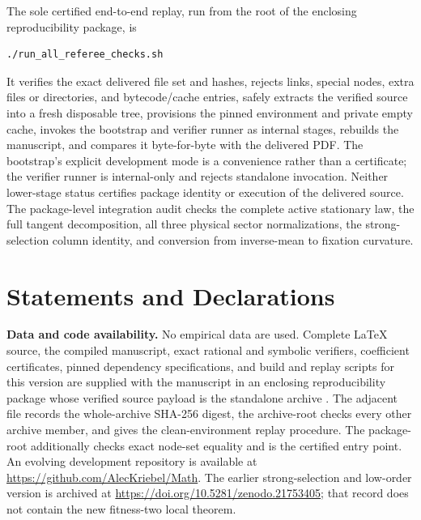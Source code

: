 The sole certified end-to-end replay, run from the root of the enclosing
reproducibility package, is
\begin{verbatim}
./run_all_referee_checks.sh
\end{verbatim}
It verifies the exact delivered file set and hashes, rejects links, special
nodes, extra files or directories, and bytecode/cache entries, safely extracts
the verified source into a fresh disposable tree, provisions the pinned
environment and private empty cache, invokes the bootstrap and verifier runner
as internal stages, rebuilds the manuscript, and compares it byte-for-byte
with the delivered PDF.  The bootstrap's explicit development mode is a
convenience rather than a certificate; the verifier runner is internal-only
and rejects standalone invocation.  Neither lower-stage status certifies
package identity or execution of the delivered source.  The package-level
integration audit checks the complete active stationary law, the full tangent
decomposition, all three physical sector normalizations, the strong-selection
column identity, and conversion from inverse-mean to fixation curvature.

\section*{Statements and Declarations}

\noindent\textbf{Data and code availability.}
No empirical data are used.  Complete LaTeX source, the compiled manuscript,
exact rational and symbolic verifiers, coefficient certificates, pinned
dependency specifications, and build and replay scripts for this version are
supplied with the manuscript in an enclosing reproducibility package whose
verified source payload is the standalone archive
.  The
adjacent file
records the whole-archive SHA-256 digest, the archive-root
 checks every other archive member, and
 gives the clean-environment replay
procedure.  The package-root  additionally
checks exact node-set equality and is the certified entry point.  An evolving
development repository is available at
\url{https://github.com/AlecKriebel/Math}.  The earlier strong-selection and
low-order version is archived at
\url{https://doi.org/10.5281/zenodo.21753405}; that record does not contain
the new fitness-two local theorem.


